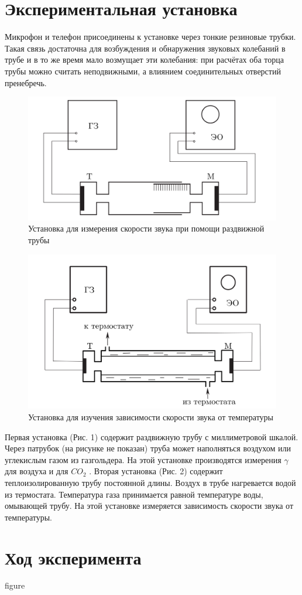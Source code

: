 \documentclass[11pt,a4paper]{article}
\begin{document}
\section*{Экспериментальная установка}
  Микрофон и телефон присоединены к установке через тонкие резиновые трубки. 
  Такая связь достаточна для возбуждения и обнаружения звуковых колебаний 
  в трубе и в то же время мало возмущает эти колебания: при расчётах оба торца трубы можно считать неподвижными, а
  влиянием соединительных отверстий пренебречь.
  \begin{figure}[h]
    \includegraphics[width=\textwidth]{movingtube.png}
    \caption{Установка для измерения скорости звука
    при помощи раздвижной трубы}
  \end{figure}
  \begin{figure}[h]
    \includegraphics[width=\textwidth]{c ot t.png}
    \caption{Установка для изучения зависимости скорости звука
    от температуры}
    \label{lala}
  \end{figure}
  Первая установка (Рис. 1) содержит раздвижную трубу с миллиметровой шкалой. 
  Через патрубок (на рисунке не показан) труба может наполняться воздухом 
  или углекислым газом из газгольдера. На
  этой установке производятся измерения $\gamma$ для воздуха и для $CO_2$ . 
  Вторая установка (Рис. 2) содержит теплоизолированную трубу постоянной
  длины. Воздух в трубе нагревается водой из термостата. Температура
  газа принимается равной температуре воды, омывающей трубу. На этой
  установке измеряется зависимость скорости звука от температуры.

\section*{Ход эксперимента}
figure~\pageref{lala}
\end{document}
